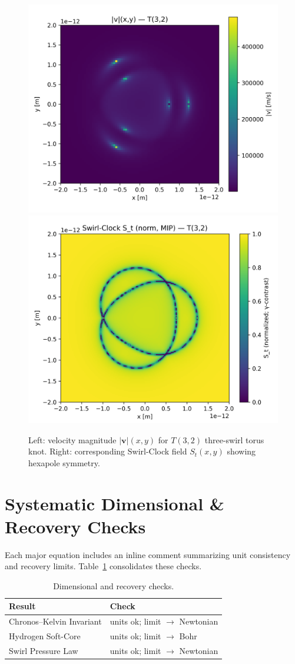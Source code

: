 \documentclass[reprint,aps,onecolumn,nofootinbib]{revtex4-2}
\begin{document}
        \begin{figure}[h!]
        \centering
        \includegraphics[width=0.48\linewidth]{figures/T3_2_velmag_heatmap}\hfill
        \includegraphics[width=0.48\linewidth]{figures/T3_2_SwirlClock_norm_MIP}
        \caption{Left: velocity magnitude $|\mathbf{v}|(x,y)$ for $T(3,2)$ three-swirl torus knot.
        Right: corresponding Swirl-Clock field $S_t(x,y)$ showing hexapole symmetry.}
        \label{fig:hexapole}
        \end{figure}


    \section{Systematic Dimensional \& Recovery Checks}
    \label{canon58:checks}
    Each major equation includes an inline comment summarizing unit consistency and recovery limits. Table~\ref{canon58:check-table} consolidates these checks.
    \begin{table}[h]
    \centering
    \begin{tabular}{l l}
    Result & Check \\ \hline
    Chronos--Kelvin Invariant & units ok; limit $\to$ Newtonian \\
    Hydrogen Soft-Core & units ok; limit $\to$ Bohr \\
    Swirl Pressure Law & units ok; limit $\to$ Newtonian \\
    \end{tabular}
    \caption{Dimensional and recovery checks.}
    \label{canon58:check-table}
    \end{table}
\end{document}
